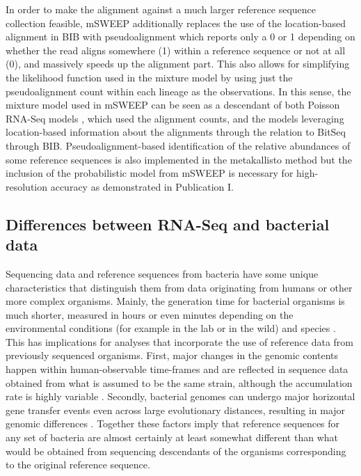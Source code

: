 \documentclass[officiallayout]{tktla}
\begin{document}
In order to make the alignment against a much larger reference
sequence collection feasible, mSWEEP additionally replaces the use of
the location-based alignment in BIB with pseudoalignment
\citep{bray2016near} which reports only a 0 or 1 depending on whether
the read aligns somewhere (1) within a reference sequence or not at
all (0), and massively speeds up the alignment part. This also allows
for simplifying the likelihood function used in the mixture model by
using just the pseudoalignment count within each lineage as the
observations. In this sense, the mixture model used in mSWEEP can be
seen as a descendant of both Poisson RNA-Seq models
\citep{jiang2009statistical, wang2010isoform}, which used the
alignment counts, and the models leveraging location-based information
about the alignments \citep{katz2010analysis, li2010rna,
  glaus2012identifying} through the relation to BitSeq through
BIB. Pseudoalignment-based identification of the relative abundances
of some reference sequences is also implemented in the metakallisto
\citep{schaeffer2017pseudoalignment} method but the inclusion of the
probabilistic model from mSWEEP is necessary for high-resolution
accuracy as demonstrated in Publication I.

\subsection{Differences between RNA-Seq and bacterial data}
\label{section:bacterial-data}

Sequencing data and reference sequences from bacteria have some unique
characteristics that distinguish them from data originating from
humans or other more complex organisms. Mainly, the generation time
for bacterial organisms is much shorter, measured in hours or even
minutes depending on the environmental conditions (for example in the
lab or in the wild) and species \citep{gibson2018distribution}. This
has implications for analyses that incorporate the use of reference
data from previously sequenced organisms. First, major changes in the
genomic contents happen within human-observable time-frames and are
reflected in sequence data obtained from what is assumed to be the
same strain, although the accumulation rate is highly variable
\citep{gibson2019investigating}. Secondly, bacterial genomes can
undergo major horizontal gene transfer events even across large
evolutionary distances, resulting in major genomic differences
\citep{arnold2022horizontal}. Together these factors imply that
reference sequences for any set of bacteria are almost certainly at
least somewhat different than what would be obtained from sequencing
descendants of the organisms corresponding to the original reference
sequence.
\end{document}
